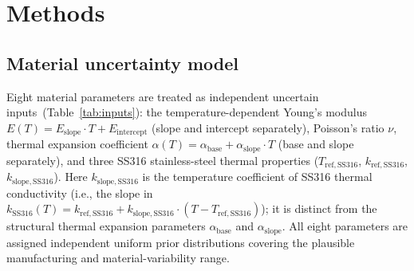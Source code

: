 \documentclass[pdflatex,sn-mathphys-num]{sn-jnl}
\theoremstyle{thmstyleone}
\theoremstyle{thmstyletwo}
\theoremstyle{thmstylethree}
\begin{document}
\section{Methods}\label{sec:methods}

\subsection{Material uncertainty model}\label{sec:inputs}


Eight material parameters are treated as independent uncertain inputs~(Table~\ref{tab:inputs}):
the temperature-dependent Young's modulus $E(T) = E_{\mathrm{slope}} \cdot T + E_{\mathrm{intercept}}$
(slope and intercept separately), Poisson's ratio $\nu$, thermal expansion coefficient
$\alpha(T) = \alpha_{\mathrm{base}} + \alpha_{\mathrm{slope}} \cdot T$
(base and slope separately), and three SS316 stainless-steel thermal properties
($T_{\mathrm{ref,SS316}}$, $k_{\mathrm{ref,SS316}}$, $k_{\mathrm{slope,SS316}}$).
Here $k_{\mathrm{slope,SS316}}$ is the temperature coefficient of SS316 thermal conductivity
(i.e., the slope in $k_{\mathrm{SS316}}(T) = k_{\mathrm{ref,SS316}} + k_{\mathrm{slope,SS316}}
\cdot (T - T_{\mathrm{ref,SS316}})$); it is distinct from the structural thermal expansion
parameters $\alpha_{\mathrm{base}}$ and $\alpha_{\mathrm{slope}}$.
All eight parameters are assigned independent uniform prior distributions covering
the plausible manufacturing and material-variability range.
\end{document}
